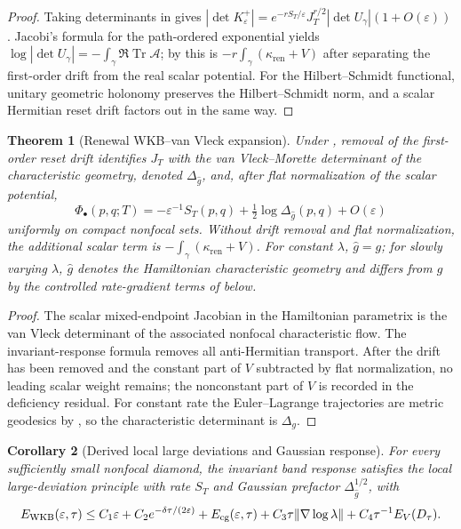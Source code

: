\documentclass[11pt]{article}
\newtheorem{theorem}{Theorem}[section]
\newtheorem{corollary}[theorem]{Corollary}
\theoremstyle{definition}
\theoremstyle{remark}
\newcommand{\eps}{\varepsilon}
\newcommand{\Tr}{\operatorname{Tr}}
\newcommand{\ren}{\mathrm{ren}}
\newcommand{\wideg}{\widehat g}
\begin{document}
\begin{proof}
Taking determinants in  gives
$|\det K^+_\eps|=e^{-rS_T/\eps}J_T^{r/2}|\det U_\gamma|(1+O(\eps))$.
Jacobi's formula for the path-ordered exponential yields
$\log|\det U_\gamma|=-\int_\gamma\Re\Tr\mathcal A$; by
 this is
$-r\int_\gamma(\kappa_{\ren}+V)$ after separating the first-order drift
from the real scalar potential.  For the Hilbert--Schmidt functional, unitary
geometric holonomy preserves the Hilbert--Schmidt norm, and a scalar Hermitian
reset drift factors out in the same way.
\end{proof}

\begin{theorem}[Renewal WKB--van Vleck expansion]
\label{thm:wkb}
Under , removal of the first-order reset drift identifies
$J_T$ with the van Vleck--Morette determinant of the characteristic geometry,
denoted $\Delta_{\wideg}$, and, after flat normalization of the scalar potential,
\[
 \Phi_\bullet(p,q;T)
 =-\eps^{-1}S_T(p,q)+\tfrac12\log\Delta_{\wideg}(p,q)+O(\eps)
\]
uniformly on compact nonfocal sets.  Without drift removal and flat normalization, the additional scalar term is
$-\int_\gamma(\kappa_{\ren}+V)$.  For constant $\lambda$,
$\wideg=g$; for slowly varying $\lambda$, $\wideg$ denotes the Hamiltonian
characteristic geometry and differs from $g$ by the controlled rate-gradient
terms of  below.
\end{theorem}

\begin{proof}
The scalar mixed-endpoint Jacobian in the Hamiltonian parametrix is the
van Vleck determinant of the associated nonfocal characteristic flow.  The
invariant-response formula removes all anti-Hermitian transport.  After the drift has been removed and the constant part of $V$ subtracted by flat
normalization, no leading scalar weight remains; the nonconstant part of $V$ is
recorded in the deficiency residual.
For constant rate the Euler--Lagrange trajectories are metric geodesics by
, so the characteristic determinant is
$\Delta_g$.
\end{proof}

\begin{corollary}[Derived local large deviations and Gaussian response]
\label{hyp:LD}
For every sufficiently small nonfocal diamond, the invariant band response
satisfies the local large-deviation principle with rate $S_T$ and Gaussian
prefactor $\Delta_{\wideg}^{1/2}$, with
\[
 E_{\rm WKB}(\eps,\tau)\le C_1\eps+C_2e^{-\delta\tau/(2\eps)}
 +E_{\rm cg}(\eps,\tau)+C_3\tau\|\nabla\log\lambda\|
 +C_4\tau^{-1}E_V(D_\tau).
\]
\end{corollary}
\end{document}

